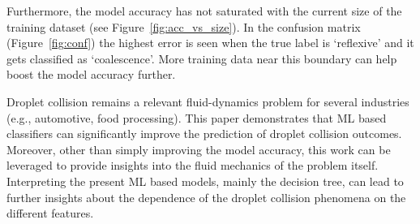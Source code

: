 \documentclass{article}
\begin{document}
Furthermore, the model accuracy has not saturated with the current size of the training dataset (see Figure~\ref{fig:acc_vs_size}). In the confusion matrix (Figure~\ref{fig:conf}) the highest error is seen when the true label is `reflexive' and it gets classified as `coalescence'. More training data near this boundary can help boost the model accuracy further.

Droplet collision remains a relevant fluid-dynamics problem for several industries (e.g., automotive, food processing). This paper demonstrates that ML based classifiers can significantly improve the prediction of droplet collision outcomes. Moreover, other than simply improving the model accuracy, this work can be leveraged to provide insights into the fluid mechanics of the problem itself. Interpreting the present ML based models, mainly the decision tree, can lead to further insights about the dependence of the droplet collision phenomena on the different features.


\end{document}
